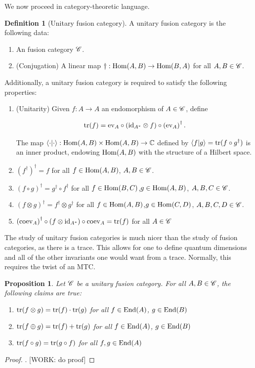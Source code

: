 \documentclass{article}
\newtheorem{proposition}{Proposition}[section]
\theoremstyle{definition}
\newtheorem*{definition}{Definition}
\numberwithin{figure}{section}
\begin{document}
We now proceed in category-theoretic language.

\begin{definition}[Unitary fusion category] A unitary fusion category is the following data:

\begin{enumerate}
\item An fusion category $\mathscr{C}$.
\item (Conjugation) A linear map $\dagger: \mathrm{Hom}(A,B)\to \mathrm{Hom}(B,A)$ for all $A,B\in \mathscr{C}$.
\end{enumerate}

Additionally, a unitary fusion category is required to satisfy the following properties:

\begin{enumerate}
\item (Unitarity) Given $f:A\to A$ an endomorphism of $A\in \mathscr{C}$, define


$$\mathrm{tr}(f)=\mathrm{ev}_A \circ (\mathrm{id}_{A^*}\otimes f)\circ \left(\mathrm{ev}_A\right)^{\dagger}.$$

The map $\left<\cdot|\cdot\right>:\mathrm{Hom}(A,B)\times \mathrm{Hom}(A,B)\to \mathbb{C}$ defined by $\left<f|g\right>=\mathrm{tr}(f\circ g^{\dagger})$ is an inner product, endowing $\mathrm{Hom}(A,B)$ with the structure of a Hilbert space.
\item $\left(f^{\dagger}\right)^{\dagger}=f$ for all $f\in \mathrm{Hom}(A,B)$, $A,B\in \mathscr{C}$.
\item $(f\circ g)^{\dagger}=g^{\dagger}\circ f^{\dagger}$ for all $f\in \mathrm{Hom}(B,C)$,$g\in \mathrm{Hom}(A,B)$, $A,B,C\in \mathscr{C}$.
\item $(f\otimes g)^{\dagger}=f^{\dagger}\otimes g^{\dagger}$ for all $f\in \mathrm{Hom}(A,B)$,$g\in \mathrm{Hom}(C,D)$, $A,B,C,D\in \mathscr{C}$.
\item $\left(\mathrm{coev}_A\right)^{\dagger}\circ (f \otimes \mathrm{id}_{A^*})\circ \mathrm{coev}_A=\mathrm{tr}(f)$ for all $A\in \mathscr{C}$
\end{enumerate}

\raggedleft\qedsymbol{}
\end{definition}

The study of unitary fusion categories is much nicer than the study of fusion categories, as there is a trace. This allows for one to define quantum dimensions and all of the other invariants one would want from a trace. Normally, this requires the twist of an MTC.

\begin{proposition} Let $\mathscr{C}$ be a unitary fusion category. For all $A,B\in \mathscr{C}$, the following claims are true:

\begin{enumerate}
\item $\mathrm{tr}(f\otimes g)=\mathrm{tr}(f)\cdot \mathrm{tr}(g)$ for all $f\in \mathrm{End}(A)$, $g\in \mathrm{End}(B)$
\item $\mathrm{tr}(f\oplus g)=\mathrm{tr}(f)+\mathrm{tr}(g)$ for all $f\in \mathrm{End}(A)$, $g\in \mathrm{End}(B)$
\item $\mathrm{tr}(f\circ g)=\mathrm{tr}(g\circ f)$ for all $f,g\in \mathrm{End}(A)$
\end{enumerate}
\end{proposition}
\begin{proof}. [WORK: do proof]
\end{proof}
\end{document}
